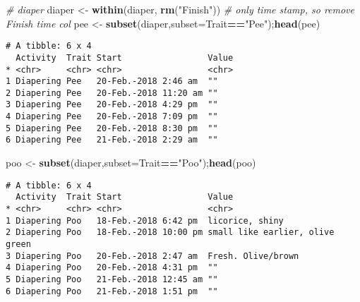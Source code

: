 \documentclass[10,portrait]{article}
\newenvironment{Shaded}{\begin{snugshade}}{\end{snugshade}}
\newcommand{\KeywordTok}[1]{\textcolor[rgb]{0.13,0.29,0.53}{\textbf{#1}}}
\newcommand{\DataTypeTok}[1]{\textcolor[rgb]{0.13,0.29,0.53}{#1}}
\newcommand{\DecValTok}[1]{\textcolor[rgb]{0.00,0.00,0.81}{#1}}
\newcommand{\StringTok}[1]{\textcolor[rgb]{0.31,0.60,0.02}{#1}}
\newcommand{\CommentTok}[1]{\textcolor[rgb]{0.56,0.35,0.01}{\textit{#1}}}
\newcommand{\OperatorTok}[1]{\textcolor[rgb]{0.81,0.36,0.00}{\textbf{#1}}}
\newcommand{\NormalTok}[1]{#1}
\begin{document}
\begin{Shaded}
\begin{Highlighting}[]
\CommentTok{# diaper}
\NormalTok{diaper <-}\StringTok{ }\KeywordTok{within}\NormalTok{(diaper, }\KeywordTok{rm}\NormalTok{(}\StringTok{"Finish"}\NormalTok{)) }\CommentTok{# only time stamp, so remove Finish time col}
\NormalTok{pee <-}\StringTok{ }\KeywordTok{subset}\NormalTok{(diaper,}\DataTypeTok{subset=}\NormalTok{Trait}\OperatorTok{==}\StringTok{"Pee"}\NormalTok{);}\KeywordTok{head}\NormalTok{(pee)}
\end{Highlighting}
\end{Shaded}

\begin{verbatim}
# A tibble: 6 x 4
  Activity  Trait Start                 Value
* <chr>     <chr> <chr>                 <chr>
1 Diapering Pee   20-Feb.-2018 2:46 am  ""   
2 Diapering Pee   20-Feb.-2018 11:20 am ""   
3 Diapering Pee   20-Feb.-2018 4:29 pm  ""   
4 Diapering Pee   20-Feb.-2018 7:09 pm  ""   
5 Diapering Pee   20-Feb.-2018 8:30 pm  ""   
6 Diapering Pee   21-Feb.-2018 2:29 am  ""   
\end{verbatim}

\begin{Shaded}
\begin{Highlighting}[]
\NormalTok{poo <-}\StringTok{ }\KeywordTok{subset}\NormalTok{(diaper,}\DataTypeTok{subset=}\NormalTok{Trait}\OperatorTok{==}\StringTok{"Poo"}\NormalTok{);}\KeywordTok{head}\NormalTok{(poo) }
\end{Highlighting}
\end{Shaded}

\begin{verbatim}
# A tibble: 6 x 4
  Activity  Trait Start                 Value                          
* <chr>     <chr> <chr>                 <chr>                          
1 Diapering Poo   18-Feb.-2018 6:42 pm  licorice, shiny                
2 Diapering Poo   18-Feb.-2018 10:00 pm small like earlier, olive green
3 Diapering Poo   20-Feb.-2018 2:47 am  Fresh. Olive/brown             
4 Diapering Poo   20-Feb.-2018 4:31 pm  ""                             
5 Diapering Poo   21-Feb.-2018 12:45 am ""                             
6 Diapering Poo   21-Feb.-2018 1:51 pm  ""                             
\end{verbatim}

\begin{Shaded}
\end{Shaded}
\end{document}
